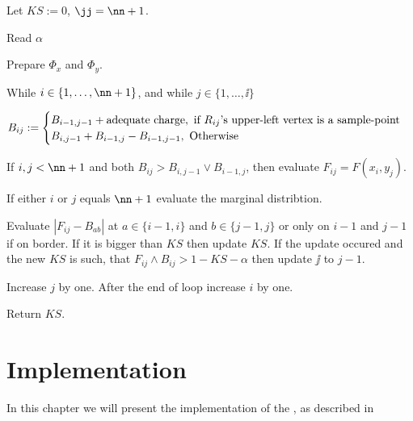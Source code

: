 



\begin{minipage}[h]{\linewidth}
\begin{algorithm}
	\item Let $KS := 0$, $\jj = \nn+1$. 
	\item Read $\alpha$
	\item Prepare $\Phi_x$ and $\Phi_y$.
	\item While $i \in \{1, \dots, \nn+1\}$, and while $j \in \{ 1, \dots, \ii \}$ 
	\begin{algorithm}
		\item $B_{ij} := 
			\begin{cases} 
				B_{i-1,j-1} + \text{adequate charge}, \text{ if $R_{ij}$'s upper-left vertex is a sample-point} \cr
				B_{i,j-1} + B_{i-1,j} -  B_{i-1,j-1}, \text{ Otherwise} 
			\end{cases}$	

		\item\label{whenToEvaluate} If $i,j < \nn+1$ and both $B_{ij} > B_{i,j-1} \vee B_{i-1,j}$, then evaluate $F_{ij} = F(x_i, y_j)$.

		\item If either $i$ or $j$ equals $\nn+1$ evaluate the marginal distribtion.

		\item\label{changes} Evaluate $|F_{ij} - B_{ab}|$ at $a \in \{i-1,i\}$ and $b \in \{j-1,j\}$ or only on $i-1$ and $j-1$ if on border. If it is bigger than $KS$ then update $KS$. If the update occured and the new $KS$ is such, that $F_{ij}\wedge B_{ij} > 1 - KS - \alpha$ then update $\jj$ to $j-1$.

		\item Increase $j$ by one. After the end of loop increase $i$ by one.

	\end{algorithm}
	\item Return $KS$.
\end{algorithm}
\end{minipage}


\chapter{ Implementation }\label{Implementation}

In this chapter we will present the implementation of the \PTalgo, as described in 

